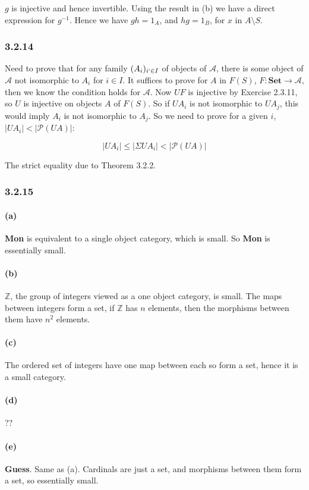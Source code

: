 \documentclass{article}
\begin{document}
$g$ is injective and hence invertible. Using the result in (b) we have a direct expression for $g^{-1}$. Hence we have $gh = 1_A$, and $hg = 1_B$, for $x$ in $A \setminus S$.

\subsubsection*{3.2.14}

Need to prove that for any family $(A_i)_{i `\in I}$  of objects of $\mathcal{A}$, there is some object of $\mathcal{A}$ not isomorphic to $A_i$ for $i \in I$.
It suffices to prove for $A$ in $F(S)$,  $F: \mathbf{Set} \rightarrow \mathcal{A}$, then we know the condition holds for $\mathcal{A}$. Now $UF$ is injective by Exercise 2.3.11,
so $U$ is injective on objects $A$ of $F(S)$. So if $UA_i$ is not isomorphic to $UA_j$, this would imply $A_i$ is not isomorphic to $A_j$. So we need to prove for a given $i$,  $|UA_i| < |\mathcal{P}(UA)|$:

\begin{equation*}
  |UA_i| \leq |\Sigma UA_i| < |\mathcal{P}(UA)|
\end{equation*}

The strict equality due to Theorem 3.2.2.

\subsubsection*{3.2.15}
\paragraph{(a)}
\textbf{Mon} is equivalent to a single object category, which is small. So \textbf{Mon} is essentially small.
\paragraph{(b)}
$\mathds{Z}$, the group of integers viewed as a one object category, is small. The maps between integers form a set, if $\mathds{Z}$ has $n$ elements, then the morphisms between them have $n^2$ elements.
\paragraph{(c)}
The ordered set of integers have one map between each so form a set, hence it is a small category.
\paragraph{(d)} ??
\paragraph{(e)} \textbf{Guess}. Same as (a). Cardinals are just a set, and morphisms between them form a set, so essentially small.
\end{document}
